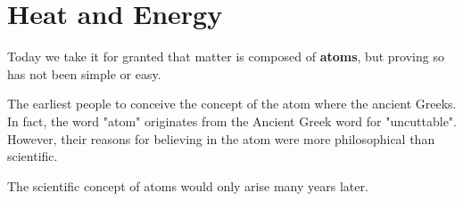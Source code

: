 \chapter{Heat and Energy}

Today we take it for granted that matter is composed of \textbf{atoms},
but proving so has not been simple or easy.

The earliest people to conceive the concept of the atom
where the ancient Greeks.
In fact,
the word "atom" originates from the Ancient Greek word for "uncuttable".
However, their reasons for believing in the atom
were more philosophical than scientific.

The scientific concept of atoms would only arise many years later.
